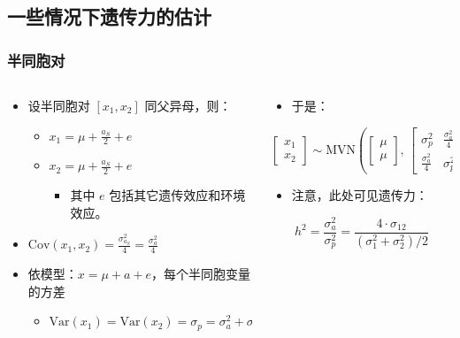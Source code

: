 \documentclass[serif,aspectratio=169]{beamer}
\begin{document}
\subsection{一些情况下遗传力的估计}
\begin{frame}
  \frametitle{半同胞对}
  \begin{columns}
    \begin{column}{.5\textwidth}
      \begin{itemize}
      \item 设半同胞对 $[x_1, x_2]$ 同父异母，则：
        \begin{itemize}
        \item $x_1 = \mu + \frac{a_S}{2} + e$
        \item $x_2 = \mu + \frac{a_S}{2} + e$
          \begin{itemize}
          \item 其中 $e$ 包括其它遗传效应和环境效应。
          \end{itemize}
        \end{itemize}
      \item $\displaystyle\mathrm{Cov}(x_1, x_2) = \frac{\sigma_{a_{S}}^2}{4} = \frac{\sigma_a^2}{4}$
      \item 依模型：$x = \mu+a+e$，每个半同胞变量的方差
        \begin{itemize}
        \item $\mathrm{Var}(x_1)=\mathrm{Var}(x_2)=\sigma_p=\sigma_a^2+\sigma_e^2$
        \end{itemize}
      \end{itemize}

      \end{column}

      \pause
      \begin{column}{.5\textwidth}
        \begin{itemize}
        \item 于是：
        \end{itemize}
        $$
        \left[\begin{array}{c}
            x_1\\
            x_2
          \end{array}
          \right]\sim\mathrm{MVN}
        \left(\left[\begin{array}{c}
            \mu\\
            \mu
          \end{array}
          \right],\,
        \left[
          \begin{array}{cc}
            \sigma_p^2 & \frac{\sigma_a^2}{4}\\
            \frac{\sigma_a^2}{4} & \sigma_p^2
          \end{array}
          \right]
        \right)
        $$
        \begin{itemize}
        \item 注意，此处可见遗传力：
        \end{itemize}
        $$h^2 = \frac{\sigma_a^2}{\sigma_p^2}=\frac{4\cdot\sigma_{12}}{(\sigma_1^2+\sigma_2^2)/2}$$
      \end{column}
  \end{columns}
\end{frame}
\end{document}
